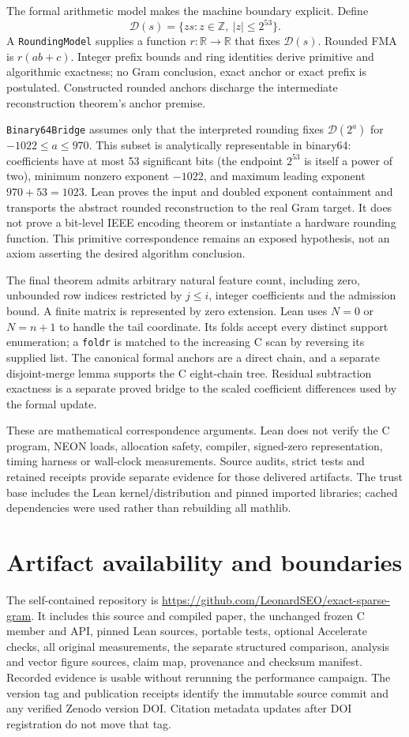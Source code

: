 \documentclass[10pt,a4paper]{article}
\newcommand{\R}{\mathbb R}
\newcommand{\Z}{\mathbb Z}
\newcommand{\abs}[1]{\lvert#1\rvert}
\begin{document}
The formal arithmetic model makes the machine boundary explicit. Define
\[
 \mathcal D(s)=\{zs:z\in\Z,\ \abs z\le2^{53}\}.
\]
A \texttt{RoundingModel} supplies a function $r:\R\to\R$ that fixes
$\mathcal D(s)$. Rounded FMA is $r(ab+c)$. Integer prefix bounds and ring
identities derive primitive and algorithmic exactness; no Gram conclusion,
exact anchor or exact prefix is postulated. Constructed rounded anchors
discharge the intermediate reconstruction theorem's anchor premise.

\texttt{Binary64Bridge} assumes only that the interpreted rounding fixes
$\mathcal D(2^a)$ for $-1022\le a\le970$. This subset is analytically
representable in binary64: coefficients have at most 53 significant bits
(the endpoint $2^{53}$ is itself a power of two), minimum nonzero exponent
$-1022$, and maximum leading exponent $970+53=1023$.
Lean proves the input and doubled exponent containment and transports the
abstract rounded reconstruction to the real Gram target. It does not prove
a bit-level IEEE encoding theorem or instantiate a hardware rounding function.
This primitive correspondence remains an exposed hypothesis, not an axiom
asserting the desired algorithm conclusion.

The final theorem admits arbitrary natural feature count, including zero,
unbounded row indices restricted by $j\le i$, integer coefficients and the
admission bound. A finite matrix is represented by zero extension. Lean uses
$N=0$ or $N=n+1$ to handle the tail coordinate. Its folds accept every
distinct support enumeration; a \texttt{foldr} is matched to the increasing
C scan by reversing its supplied list. The canonical formal anchors are a
direct chain, and a separate disjoint-merge lemma supports the C eight-chain
tree. Residual subtraction exactness is a separate proved bridge to the
scaled coefficient differences used by the formal update.

These are mathematical correspondence arguments. Lean does not verify the C
program, NEON loads, allocation safety, compiler, signed-zero representation,
timing harness or wall-clock measurements. Source audits, strict tests and
retained receipts provide separate evidence for those delivered artifacts.
The trust base includes the Lean kernel/distribution and pinned imported
libraries; cached dependencies were used rather than rebuilding all mathlib.

\section{Artifact availability and boundaries}
The self-contained repository is
\url{https://github.com/LeonardSEO/exact-sparse-gram}. It includes this source
and compiled paper, the unchanged frozen C member and API, pinned Lean sources,
portable tests, optional Accelerate checks, all original measurements, the
separate structured comparison, analysis and vector figure sources, claim map,
provenance and checksum manifest. Recorded evidence is usable without rerunning
the performance campaign. The version tag and publication receipts identify
the immutable source commit and any verified Zenodo version DOI. Citation
metadata updates after DOI registration do not move that tag.
\end{document}
